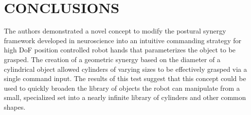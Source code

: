 \documentclass[runningheads,a4paper]{llncs}
\begin{document}

 
\section{CONCLUSIONS}

The authors demonstrated a novel concept to modify the postural synergy framework developed in neuroscience into an intuitive commanding strategy for high DoF position controlled robot hands that parameterizes the object to be grasped. The creation of a geometric synergy based on the diameter of a cylindrical object allowed cylinders of varying sizes to be effectively grasped via a single command input. The results of this test suggest that this concept could be used to quickly broaden the library of objects the robot can manipulate from a small, specialized set into a nearly infinite library of cylinders and other common shapes. 




\end{document}
